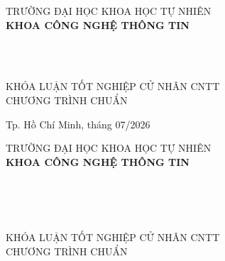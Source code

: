 \begin{titlepage}

\begin{center}
TRƯỜNG ĐẠI HỌC KHOA HỌC TỰ NHIÊN\\
\textbf{KHOA CÔNG NGHỆ THÔNG TIN}\\[2cm]


{ \Large \bfseries \tenSV\\[2cm] } 

{ \Large \bfseries \MakeUppercase{\tenKLcover}\\[3cm]}


\large KHÓA LUẬN TỐT NGHIỆP CỬ NHÂN CNTT\\
\large CHƯƠNG TRÌNH CHUẨN\\



\vfill
Tp. Hồ Chí Minh, tháng 07/2026

\end{center}

\pagebreak



\begin{center}

TRƯỜNG ĐẠI HỌC KHOA HỌC TỰ NHIÊN\\
\textbf{KHOA CÔNG NGHỆ THÔNG TIN}\\[2cm]


{\large \bfseries \tenSV\\} 
{\large \bfseries \mssv\\[2cm]}

{ \Large \bfseries \MakeUppercase{\tenKLcover}\\[2cm] }


\large KHÓA LUẬN TỐT NGHIỆP CỬ NHÂN CNTT\\
\large CHƯƠNG TRÌNH CHUẨN\\[2cm]


\end{center}
\end{titlepage}
